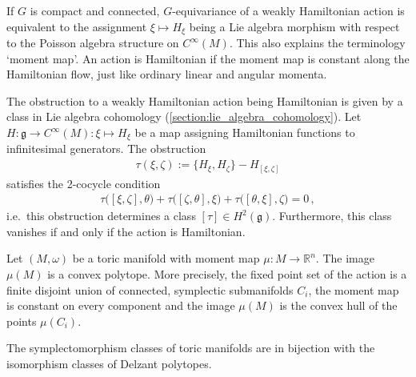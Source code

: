     \begin{property}[Obstruction]
        If $G$ is compact and connected, $G$-equivariance of a weakly Hamiltonian action is equivalent to the assignment $\xi\mapsto H_\xi$ being a Lie algebra morphism with respect to the Poisson algebra structure on $C^\infty(M)$. This also explains the terminology `moment map'. An action is Hamiltonian if the moment map is constant along the Hamiltonian flow, just like ordinary linear and angular momenta.

        The obstruction to a weakly Hamiltonian action being Hamiltonian is given by a class in Lie algebra cohomology (\cref{section:lie_algebra_cohomology}). Let $H:\mathfrak{g}\rightarrow C^\infty(M):\xi\mapsto H_\xi$ be a map assigning Hamiltonian functions to infinitesimal generators. The obstruction
        \begin{gather}
            \tau(\xi,\zeta) := \{H_\xi,H_\zeta\} - H_{[\xi,\zeta]}
        \end{gather}
        satisfies the 2-cocycle condition
        \begin{gather}
            \tau\bigl([\xi,\zeta],\theta\bigr) + \tau\bigl([\zeta,\theta],\xi\bigr) + \tau\bigl([\theta,\xi],\zeta\bigr) = 0\,,
        \end{gather}
        i.e.~this obstruction determines a class $[\tau]\in H^2(\mathfrak{g})$. Furthermore, this class vanishes if and only if the action is Hamiltonian.
    \end{property}

    \begin{theorem}
        Let $(M,\omega)$ be a toric manifold with moment map $\mu:M\rightarrow\mathbb{R}^n$. The image $\mu(M)$ is a convex polytope. More precisely, the fixed point set of the action is a finite disjoint union of connected, symplectic submanifolds $C_i$, the moment map is constant on every component and the image $\mu(M)$ is the convex hull of the points $\mu(C_i)$.
    \end{theorem}

    \begin{theorem}[Delzant]
        The symplectomorphism classes of toric manifolds are in bijection with the isomorphism classes of Delzant polytopes.
    \end{theorem}

